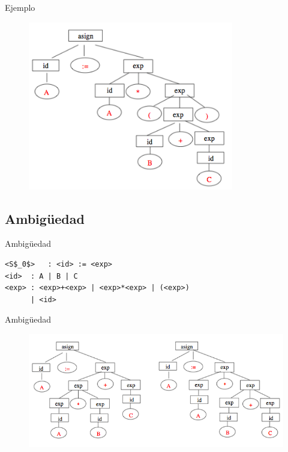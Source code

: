\documentclass{beamer}
\begin{document}
\begin{frame}{Ejemplo}
    \begin{figure}
    \centering
    \includegraphics[width=0.8\textwidth]{parse}
    \end{figure}
\end{frame}

\subsection{Ambigüedad}
\begin{frame}[fragile]{Ambigüedad}
\begin{example}
\begin{lstlisting}
<S$_0$>   : <id> := <exp>
<id>  : A | B | C
<exp> : <exp>+<exp> | <exp>*<exp> | (<exp>)
      | <id>
\end{lstlisting}
\end{example}
\end{frame}

\begin{frame}{Ambigüedad}
\begin{figure}
\centering
\includegraphics[width=\textwidth]{ambi}
\end{figure}
\end{frame}
\end{document}
